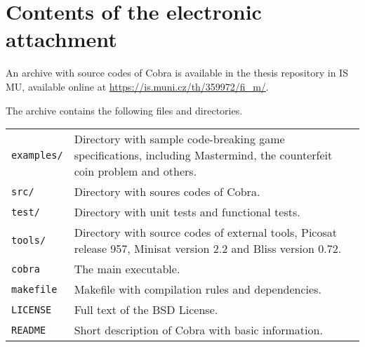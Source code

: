 \chapter*{Contents of the electronic attachment}

An archive with source codes of Cobra
is available in the thesis repository in IS MU,
available online at \url{https://is.muni.cz/th/359972/fi_m/}.

The archive contains the following files and directories.

\bigskip
\begin{tabularx}{\textwidth}{lX}
 \texttt{examples/}\hfill & Directory with sample code-breaking game specifications,
        including Mastermind, the counterfeit coin problem and others. \\
\texttt{src/} & Directory with soures codes of Cobra. \\
\texttt{test/} & Directory with unit tests and functional tests. \\
\texttt{tools/} & Directory with source codes of external tools, Picosat release 957, Minisat version 2.2 and Bliss version 0.72. \\
\texttt{cobra} & The main executable. \\
\texttt{makefile} & Makefile with compilation rules and dependencies. \\
\texttt{LICENSE} & Full text of the BSD License. \\
\texttt{README} & Short description of Cobra with basic information. \\
\end{tabularx}
